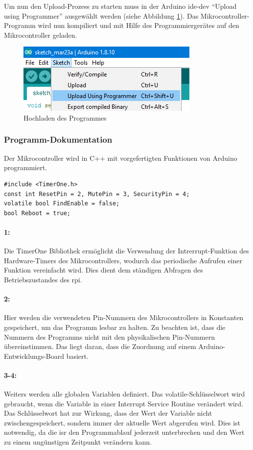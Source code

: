 Um nun den Upload-Prozess zu starten muss in der Arduino \ac{ide-dev} \enquote{Upload using Programmer} ausgewählt werden (siehe Abbildung \ref{fig:arduino-upload}).
Das Mikrocontroller-Programm wird nun kompiliert und mit Hilfe des Programmiergerätes auf den Mikrocontroller geladen.
\begin{figure}[htbp!]
    \centering
\includegraphics[width=.7\linewidth]{images/hardware-programmierung/upload.png}
    \caption{Hochladen des Programmes}
    \label{fig:arduino-upload}
\end{figure}

\subsubsection{Programm-Dokumentation}
Der Mikrocontroller wird in C++ mit vorgefertigten Funktionen von Arduino programmiert.

\begin{verbatim}
#include <TimerOne.h>
const int ResetPin = 2, MutePin = 3, SecurityPin = 4;
volatile bool FindEnable = false;
bool Reboot = true;
\end{verbatim}
\paragraph{1:}
Die TimerOne Bibliothek ermöglicht die Verwendung der Intrerrupt-Funktion des Hardware-Timers des Mikrocontrollers, wodurch das periodische Aufrufen einer Funktion vereinfacht wird.
Dies dient dem ständigen Abfragen des Betriebszustandes des \ac{rpi}.

\paragraph{2:}
Hier werden die verwendeten Pin-Nummern des Mikrocontrollers in Konstanten gespeichert, um das Programm lesbar zu halten.
Zu beachten ist, dass die Nummern des Programms nicht mit den physikalischen Pin-Nummern übereinstimmen.
Das liegt daran, dass die Zuordnung auf einem Arduino-Entwicklungs-Board basiert.

\paragraph{3-4:}
Weiters werden alle globalen Variablen definiert.
Das volatile-Schlüsselwort wird gebraucht, wenn die Variable in einer Interrupt Service Routine verändert wird.
Das Schlüsselwort hat zur Wirkung, dass der Wert der Variable nicht zwischengespeichert, sondern immer der aktuelle Wert abgerufen wird.
Dies ist notwendig, da die \ac{isr} den Programmablauf jederzeit unterbrechen und den Wert zu einem ungünstigen Zeitpunkt verändern kann.

